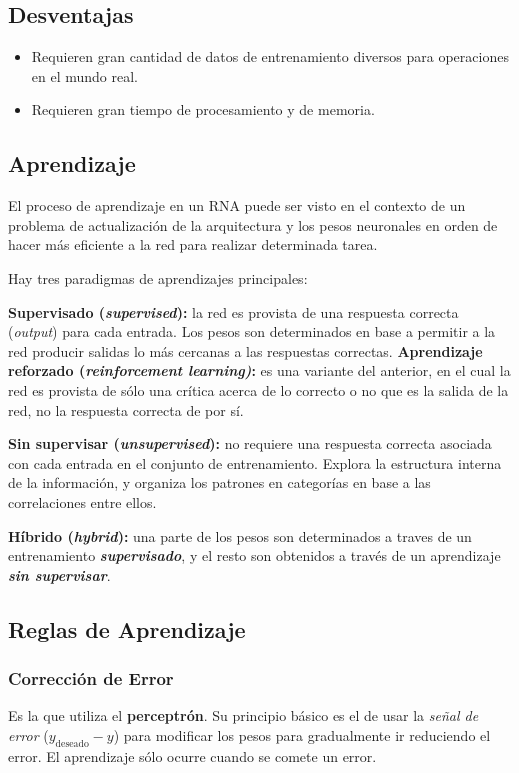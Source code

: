 \documentclass[10pt,a4paper]{article}
\begin{document}
\subsection{Desventajas}
\begin{itemize}
\item Requieren gran cantidad de datos de entrenamiento diversos para operaciones en el mundo real.
\item Requieren gran tiempo de procesamiento y de memoria.
\end{itemize}

\subsection{Aprendizaje}
El proceso de aprendizaje en un RNA puede ser visto en el contexto de un problema de actualización de la arquitectura y los pesos neuronales en orden de hacer más eficiente a la red para realizar determinada tarea.

Hay tres paradigmas de aprendizajes principales:
\begin{description}
\item \textbf{Supervisado (\textit{supervised}):} la red es provista de una respuesta correcta (\textit{output}) para cada entrada. Los pesos son determinados en base a permitir a la red producir salidas lo más cercanas a las respuestas correctas.
\subitem \textbf{Aprendizaje reforzado (\textit{reinforcement learning)}:} es una variante del anterior, en el cual la red es provista de sólo una crítica acerca de lo correcto o no que es la salida de la red, no la respuesta correcta de por sí.
\item \textbf{Sin supervisar (\textit{unsupervised}):} no requiere una respuesta correcta asociada con cada entrada en el conjunto de entrenamiento. Explora la estructura interna de la información, y organiza los patrones en categorías en base a las correlaciones entre ellos.
\item \textbf{Híbrido (\textit{hybrid}):} una parte de los pesos son determinados a traves de un entrenamiento \textbf{\textit{supervisado}}, y el resto son obtenidos a través de un aprendizaje \textbf{\textit{sin supervisar}}.
\end{description}

\subsection{Reglas de Aprendizaje}
\subsubsection{Corrección de Error}
Es la que utiliza el \textbf{perceptrón}. Su principio básico es el de usar la \textit{señal de error} ($y_{\text{deseado}}-y$) para modificar los pesos para gradualmente ir reduciendo el error. El aprendizaje sólo ocurre cuando se comete un error.
\end{document}
